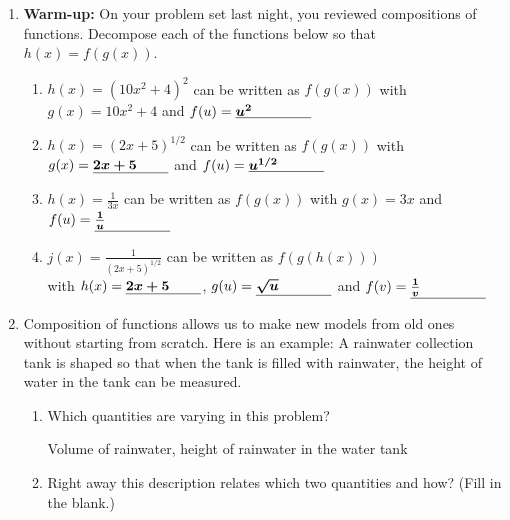 \documentclass{article}
\begin{document}
\begin{enumerate}
\item {\bf Warm-up:} On your problem set last night, you reviewed compositions of functions. Decompose each of the functions below so that $h(x) = f(g(x))$.  

\begin{enumerate}
  \item \label{chain-rule-decompose-1-1} $h(x) = (10x^2+4)^2$ can be written as
    $f(g(x))$ with $g(x) = 10x^2+4$ and $f(u) = \fitb{0.75in}{u^2}$
    \pspace{12pt}

     \item \label{chain-rule-decompose-1-2} $h(x) = (2x+5)^{1/2}$ can be written as
    $f(g(x))$ with $g(x) = \fitb{0.75in}{2x+5}$ and $f(u) = \fitb{0.75in}{u^{1/2}}$
    \pspace{12pt}

  \item $h(x) =\displaystyle \frac{1}{3x}$ can be written as $f(g(x))$
    with $g(x) = 3x$ and $f(u) = \fitb{0.75in}{\frac{1}{u}}$
    \pspace{12pt}

    \item $j(x) =\displaystyle \frac{1}{(2x+5)^{1/2}}$ can be written as $f(g(h(x)))$\\
    
    with $h(x) = \fitb{0.75in}{2x+5}$, $g(u) = \fitb{0.75in}{\sqrt{u}}$ and $f(v) = \fitb{0.75in}{\frac{1}{v}}$
    \pspace{12pt}
    \end{enumerate}
    
\item 

  Composition of functions allows us to make new models from old ones without starting from scratch. Here is an example: A rainwater collection tank is shaped so that 
  when the tank is filled with rainwater,
  the height of water in the tank can be measured. 
\begin{enumerate}
\item Which quantities are varying in this problem?
\begin{problemonly}
    \vfill
\end{problemonly}
\begin{solution}
    Volume of rainwater, height of rainwater in the water tank
\end{solution}

  \item Right away this description relates which two quantities and how? (Fill in the blank.)\\
  

\end{enumerate}
\end{enumerate}
\end{document}
